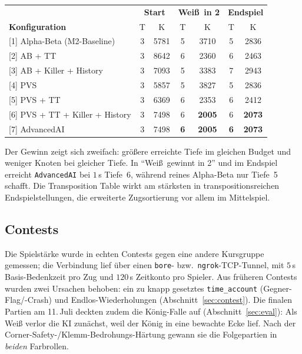 \documentclass[11pt,a4paper]{article}
\newcommand{\code}[1]{\texttt{\small #1}}
\begin{document}
\begin{center}
\label{tab:nodes}
\small
\setlength{\tabcolsep}{4.5pt}
\begin{tabular}{>{\raggedright}p{5.3cm}cccccc}
\toprule
 & \multicolumn{2}{c}{\textbf{Start}} & \multicolumn{2}{c}{\textbf{Wei\ss\ in 2}} & \multicolumn{2}{c}{\textbf{Endspiel}} \\
\textbf{Konfiguration} & T & K & T & K & T & K \\
\midrule
{[1]} Alpha-Beta (M2-Baseline)     & 3 & 5781 & 5 & 3710 & 5 & 2836 \\
{[2]} AB + TT                      & 3 & 8642 & 6 & 2360 & 6 & 2463 \\
{[3]} AB + Killer + History       & 3 & 7093 & 5 & 3383 & 7 & 2943 \\
{[4]} PVS                         & 3 & 5857 & 5 & 3827 & 5 & 2836 \\
{[5]} PVS + TT                    & 3 & 6369 & 6 & 2353 & 6 & 2412 \\
{[6]} PVS + TT + Killer + History & 3 & 7498 & 6 & \textbf{2005} & 6 & \textbf{2073} \\
{[7]} AdvancedAI                   & 3 & 7498 & \textbf{6} & \textbf{2005} & \textbf{6} & \textbf{2073} \\
\bottomrule
\end{tabular}
\end{center}

Der Gewinn zeigt sich zweifach: gr\"o\ss ere erreichte Tiefe im gleichen Budget
und weniger Knoten bei gleicher Tiefe.
In ``Wei\ss\ gewinnt in 2'' und im Endspiel erreicht \code{AdvancedAI} bei $1$\,s
Tiefe~6, w\"ahrend reines Alpha-Beta nur Tiefe~5 schafft.
Die Transposition Table wirkt am st\"arksten in transpositionsreichen
Endspielstellungen, die erweiterte Zugsortierung vor allem im Mittelspiel.

\subsection{Contests}
Die Spielst\"arke wurde in echten Contests gegen eine andere Kursgruppe gemessen;
die Verbindung lief \"uber einen \code{bore}- bzw.\ \code{ngrok}-TCP-Tunnel, mit
$5$\,s Basis-Bedenkzeit pro Zug und $120$\,s Zeitkonto pro Spieler.
Aus fr\"uheren Contests wurden zwei Ursachen behoben: ein zu knapp gesetztes
\code{time\_account} (Gegner-Flag/-Crash) und Endlos-Wiederholungen
(Abschnitt~\ref{sec:contest}).
Die finalen Partien am 11.\,Juli deckten zudem die K\"onig-Falle auf
(Abschnitt~\ref{sec:eval}): Als Wei\ss{} verlor die KI zun\"achst, weil der K\"onig in
eine bewachte Ecke lief.
Nach der Corner-Safety-/Klemm-Bedrohungs-H\"artung gewann sie die Folgepartien in
\emph{beiden} Farbrollen.
\end{document}
